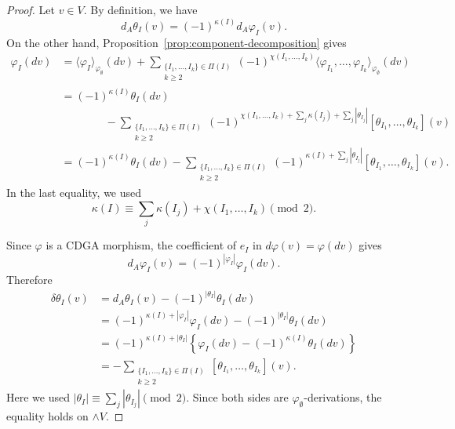 \documentclass[a4paper,10pt]{amsart}
\theoremstyle{definition}
\theoremstyle{remark}
\numberwithin{equation}{section}
\begin{document}
\begin{proof}
Let $v\in V$. By definition, we have
\[
        d_A\theta_I(v)=(-1)^{\kappa(I)}d_A\varphi_I(v).
\]
On the other hand, Proposition~\ref{prop:component-decomposition} gives
\begin{align*}
\varphi_I(dv)
&=
\langle \varphi_I\rangle_{\varphi_{\emptyset}}(dv)
+
\sum_{\substack{\{I_1,\ldots,I_k\}\in\Pi(I)\\ k\geq 2}}
(-1)^{\chi(I_1,\ldots,I_k)}
\langle
\varphi_{I_1},\ldots,\varphi_{I_k}
\rangle_{\varphi_{\emptyset}}(dv)       \\
&=
(-1)^{\kappa(I)}\theta_I(dv)
\\
&
\hspace{4em}
-
\sum_{\substack{\{I_1,\ldots,I_k\}\in\Pi(I)\\ k\geq 2}}
(-1)^{\chi(I_1,\ldots,I_k)
+\sum_j\kappa(I_j)+\sum_j|\theta_{I_j}|}
[
\theta_{I_1},\ldots,\theta_{I_k}
](v)                                      \\
&=
(-1)^{\kappa(I)}\theta_I(dv)
-
\sum_{\substack{\{I_1,\ldots,I_k\}\in\Pi(I)\\ k\geq 2}}
(-1)^{\kappa(I)+\sum_j|\theta_{I_j}|}
[
\theta_{I_1},\ldots,\theta_{I_k}
](v).
\end{align*}
In the last equality, we used
\[
\kappa(I)
\equiv
\sum_j\kappa(I_j)+\chi(I_1,\ldots,I_k)
\pmod 2.
\]

Since $\varphi$ is a CDGA morphism, the coefficient of $e_I$ in
$d\varphi(v)=\varphi(dv)$ gives
\[
        d_A\varphi_I(v)=(-1)^{|\varphi_I|}\varphi_I(dv).
\]
Therefore
\begin{align*}
\delta\theta_I(v)
&=
d_A\theta_I(v)-(-1)^{|\theta_I|}\theta_I(dv)                         \\
&=
(-1)^{\kappa(I)+|\varphi_I|}\varphi_I(dv)
-
(-1)^{|\theta_I|}\theta_I(dv)                                         \\
&=
(-1)^{\kappa(I)+|\theta_I|}
\left\{
\varphi_I(dv)-(-1)^{\kappa(I)}\theta_I(dv)
\right\}                                                             \\
&=
-
\sum_{\substack{\{I_1,\ldots,I_k\}\in\Pi(I)\\ k\geq 2}}
[
\theta_{I_1},\ldots,\theta_{I_k}
](v).
\end{align*}
Here we used
$
|\theta_I|\equiv \sum_j|\theta_{I_j}|\pmod 2.
$
Since both sides are $\varphi_{\emptyset}$-derivations, the equality holds on
$\wedge V$.
\end{proof}
\end{document}

